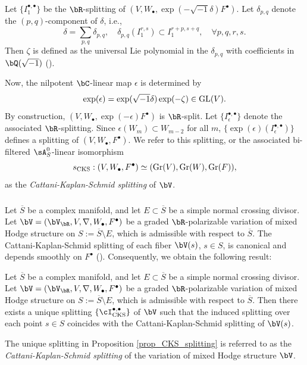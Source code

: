\documentclass[11pt,letterpaper]{amsart}
\numberwithin{equation}{section}
\begin{document}
	Let $\{I^{\bullet,\bullet}_1\}$ be the $\bR$-splitting of $(V, W_\bullet, \exp(-\sqrt{-1}\delta)F^\bullet)$. Let $\delta_{p,q}$ denote the $(p,q)$-component of $\delta$, i.e.,  
	$$
	\delta = \sum_{p,q} \delta_{p,q}, \quad \delta_{p,q}(I^{r,s}_1) \subset I^{r+p,s+q}_1, \quad \forall p, q, r, s.
	$$  
	Then $\zeta$ is defined as the universal Lie polynomial in the $\delta_{p,q}$ with coefficients in $\bQ(\sqrt{-1})$ (\cite[Lemma 6.60]{Cattani_Kaplan_Schmid1986}).  
	
	Now, the nilpotent $\bC$-linear map $\epsilon$ is determined by  
	$$
	\exp(\epsilon) = \exp(\sqrt{-1}\delta)\exp(-\zeta) \in {\rm GL}(V).
	$$  
	By construction, $(V, W_\bullet, \exp(-\epsilon)F^\bullet)$ is $\bR$-split. Let $\{I^{\bullet,\bullet}_{\epsilon}\}$ denote the associated $\bR$-splitting. Since $\epsilon(W_m) \subset W_{m-2}$ for all $m$, $\{\exp(\epsilon)(I^{\bullet,\bullet}_{\epsilon})\}$ defines a splitting of $(V, W_\bullet, F^\bullet)$. We refer to this splitting, or the associated bi-filtered $\sA^0_S$-linear isomorphism  
	$$
	s_{\rm CKS}: (V, W_\bullet, F^\bullet) \simeq ({\rm Gr}(V), {\rm Gr}(W), {\rm Gr}(F)),
	$$  
	as the \emph{Cattani-Kaplan-Schmid splitting} of $\bV$.
	\subsubsection{}
	Let $\overline{S}$ be a complex manifold, and let $E \subset \overline{S}$ be a simple normal crossing divisor. Let $\bV = (\bV_{\bR}, V, \nabla, W_\bullet, F^\bullet)$ be a graded $\bR$-polarizable variation of mixed Hodge structure on $S := \overline{S} \setminus E$, which is admissible with respect to $\overline{S}$. The Cattani-Kaplan-Schmid splitting of each fiber $\bV(s)$, $s \in S$, is canonical and depends smoothly on $F^\bullet$ (\cite[Corollary 3.29]{Cattani_Kaplan_Schmid1986}). Consequently, we obtain the following result:      
	\begin{prop}\label{prop_CKS_splitting}  
		Let $\overline{S}$ be a complex manifold, and let $E \subset \overline{S}$ be a simple normal crossing divisor. Let $\bV = (\bV_{\bR}, V, \nabla, W_\bullet, F^\bullet)$ be a graded $\bR$-polarizable variation of mixed Hodge structure on $S := \overline{S} \setminus E$, which is admissible with respect to $\overline{S}$. Then there exists a unique splitting $\{\cI^{\bullet,\bullet}_{\rm CKS}\}$ of $\bV$ such that the induced splitting over each point $s \in S$ coincides with the Cattani-Kaplan-Schmid splitting of $\bV(s)$.  
	\end{prop}      
	The unique splitting in Proposition \ref{prop_CKS_splitting} is referred to as the \emph{Cattani-Kaplan-Schmid splitting} of the variation of mixed Hodge structure $\bV$. 
\end{document}
